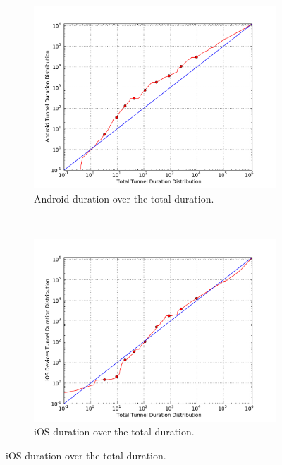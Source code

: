 \begin{figure}[htbp]
        \centering
        \begin{subfigure}[b]{0.50\textwidth}
            \centering
            \includegraphics[width=\textwidth]{images/qq-total-vs-android.pdf}
            \caption{Android duration over the total duration.}
            \label{c4:fig:qq-total-vs-android}
        \end{subfigure}%
        ~
        \begin{subfigure}[b]{0.50\textwidth}
            \centering
            \includegraphics[width=\textwidth]{images/qq-total-vs-ios.pdf}
            \caption{iOS duration over the total duration.}
            \label{c4:fig:qq-total-vs-ios}
        \end{subfigure}


\end{figure}
